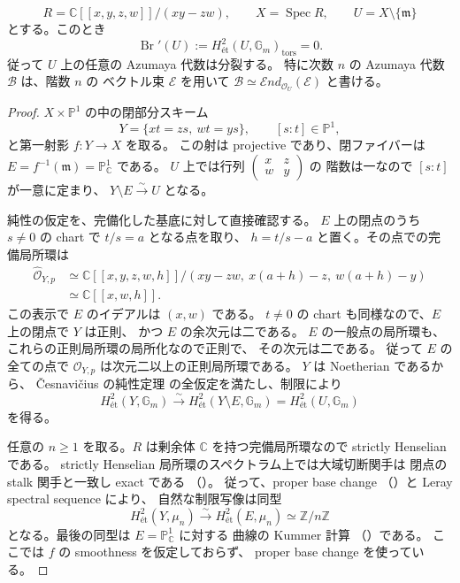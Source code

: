 \begin{lemma}
\label{cmo:lem:formal-node-brauer}
\[
 R=\mathbb C[[x,y,z,w]]/(xy-zw),\qquad
 X=\operatorname{Spec}R,\qquad
 U=X\setminus\{\mathfrak m\}
\]
とする。このとき
\[
 \operatorname{Br}'(U):=
 H^2_{\text{ét}}(U,\mathbb G_m)_{\mathrm{tors}}=0.
\]
従って $U$ 上の任意の Azumaya 代数は分裂する。
特に次数 $n$ の Azumaya 代数 $\mathcal B$ は、階数 $n$ の
ベクトル束 $\mathcal E$ を用いて
$\mathcal B\simeq\mathcal E nd_{\mathcal O_U}(\mathcal E)$ と書ける。
\end{lemma}

\begin{proof}
$X\times\mathbb P^1$ の中の閉部分スキーム
\[
 Y=\{xt=zs,\ wt=ys\},
 \qquad [s:t]\in\mathbb P^1,
\]
と第一射影 $f:Y\to X$ を取る。
この射は projective であり、閉ファイバーは
$E=f^{-1}(\mathfrak m)=\mathbb P^1_{\mathbb C}$ である。
$U$ 上では行列
$\left(\begin{smallmatrix}x&z\\w&y\end{smallmatrix}\right)$ の
階数は一なので $[s:t]$ が一意に定まり、
$Y\setminus E\xrightarrow{\sim}U$ となる。

純性の仮定を、完備化した基底に対して直接確認する。
$E$ 上の閉点のうち $s\ne0$ の chart で $t/s=a$ となる点を取り、
$h=t/s-a$ と置く。その点での完備局所環は
\[
 \begin{split}
 \widehat{\mathcal O}_{Y,p}
 &\simeq
 \mathbb C[[x,y,z,w,h]]/
 (xy-zw,\ x(a+h)-z,\ w(a+h)-y)\\
 &\simeq \mathbb C[[x,w,h]].
 \end{split}
\]
この表示で $E$ のイデアルは $(x,w)$ である。
$t\ne0$ の chart も同様なので、$E$ 上の閉点で $Y$ は正則、
かつ $E$ の余次元は二である。
$E$ の一般点の局所環も、これらの正則局所環の局所化なので正則で、
その次元は二である。
従って $E$ の全ての点で $\mathcal O_{Y,p}$ は次元二以上の正則局所環である。
$Y$ は Noetherian であるから、
\v{C}esnavi\v{c}ius の純性定理
\cite[Theorem~1.1 (=Theorem~6.1)]{CMOCesnaviciusBrauer}
の全仮定を満たし、制限により
\begin{equation}
 H^2_{\text{ét}}(Y,\mathbb G_m)
 \xrightarrow{\sim}
 H^2_{\text{ét}}(Y\setminus E,\mathbb G_m)
 =
 H^2_{\text{ét}}(U,\mathbb G_m)
 \label{cmo:eq:node-brauer-purity}
\end{equation}
を得る。

任意の $n\ge1$ を取る。$R$ は剰余体 $\mathbb C$ を持つ完備局所環なので
strictly Henselian である。
strictly Henselian 局所環のスペクトラム上では大域切断関手は
閉点の stalk 関手と一致し exact である
（\cite[Lemma~59.55.1, Tag~03QN]{CMOStacksNode}）。
従って、proper base change
（\cite[Theorem~59.91.11, Tag~095T]{CMOStacksNode}）と Leray spectral sequence により、
自然な制限写像は同型
\[
 H^2_{\text{ét}}(Y,\mu_n)
 \xrightarrow{\sim}
 H^2_{\text{ét}}(E,\mu_n)
 \simeq\mathbb Z/n\mathbb Z
\]
となる。最後の同型は $E=\mathbb P^1_{\mathbb C}$ に対する
曲線の Kummer 計算
（\cite[Lemma~59.69.1, Tag~03RQ]{CMOStacksNode}）である。
ここでは $f$ の smoothness を仮定しておらず、
proper base change を使っている。


\end{proof}
